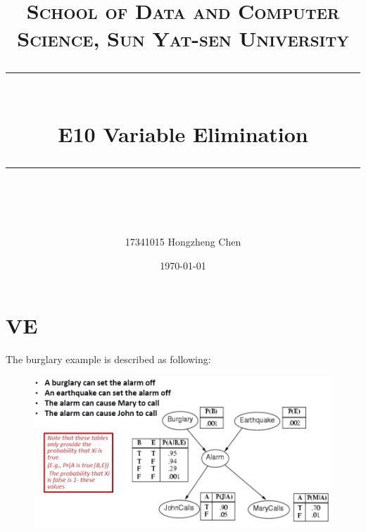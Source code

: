 \documentclass[a4paper, 11pt]{article}
\title{
\normalfont \normalsize
\textsc{School of Data and Computer Science, Sun Yat-sen University} \\ [25pt] %
\rule{\textwidth}{0.5pt} \\[0.4cm] %
\huge  E10 Variable Elimination \\ %
\rule{\textwidth}{2pt} \\[0.5cm] %
\author{17341015 Hongzheng Chen}
\date{\normalsize\today}
}
\begin{document}
\maketitle
\tableofcontents
\newpage


\section{VE}

The burglary example is described as following:
\begin{figure}[h]
  \centering

  \includegraphics[width=14cm]{fig/burglary}
\end{figure}
\end{document}
